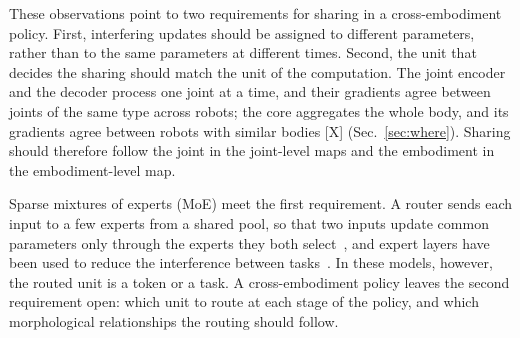 These observations point to two requirements for sharing in a cross-embodiment policy. First, interfering updates
should be assigned to different parameters, rather than to the same parameters at different times. Second, the unit
that decides the sharing should match the unit of the computation. The joint encoder and the decoder process one joint
at a time, and their gradients agree between joints of the same type across robots; the core aggregates the whole
body, and its gradients agree between robots with similar bodies [X] (Sec.~\ref{sec:where}). Sharing should
therefore follow the joint in the joint-level maps and the embodiment in the embodiment-level map.

Sparse mixtures of experts (MoE) meet the first requirement. A router sends each input to a few experts from a shared
pool, so that two inputs update common parameters only through the experts they both
select~\citep{shazeer2017outrageously,fedus2022switch}, and expert layers have been used to reduce the interference
between tasks~\citep{chen2023modsquad,hendawy2024moore}. In these models, however, the routed unit is a token or a
task. A cross-embodiment policy leaves the second requirement open: which unit to route at each stage of the policy,
and which morphological relationships the routing should follow.

